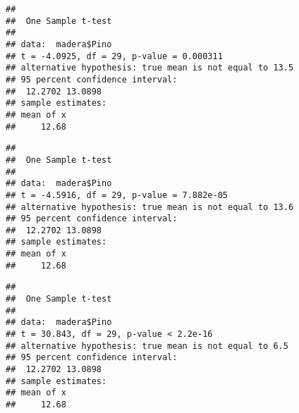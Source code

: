 \documentclass[
]{article}
\newenvironment{Shaded}{\begin{snugshade}}{\end{snugshade}}
\newcommand{\AttributeTok}[1]{\textcolor[rgb]{0.77,0.63,0.00}{#1}}
\newcommand{\CommentTok}[1]{\textcolor[rgb]{0.56,0.35,0.01}{\textit{#1}}}
\newcommand{\FloatTok}[1]{\textcolor[rgb]{0.00,0.00,0.81}{#1}}
\newcommand{\FunctionTok}[1]{\textcolor[rgb]{0.00,0.00,0.00}{#1}}
\newcommand{\NormalTok}[1]{#1}
\newcommand{\SpecialCharTok}[1]{\textcolor[rgb]{0.00,0.00,0.00}{#1}}
\begin{document}
\begin{Shaded}
\end{Shaded}

\begin{verbatim}
## 
##  One Sample t-test
## 
## data:  madera$Pino
## t = -4.0925, df = 29, p-value = 0.000311
## alternative hypothesis: true mean is not equal to 13.5
## 95 percent confidence interval:
##  12.2702 13.0898
## sample estimates:
## mean of x 
##     12.68
\end{verbatim}

\begin{Shaded}
\end{Shaded}

\begin{verbatim}
## 
##  One Sample t-test
## 
## data:  madera$Pino
## t = -4.5916, df = 29, p-value = 7.882e-05
## alternative hypothesis: true mean is not equal to 13.6
## 95 percent confidence interval:
##  12.2702 13.0898
## sample estimates:
## mean of x 
##     12.68
\end{verbatim}

\begin{Shaded}
\end{Shaded}

\begin{verbatim}
## 
##  One Sample t-test
## 
## data:  madera$Pino
## t = 30.843, df = 29, p-value < 2.2e-16
## alternative hypothesis: true mean is not equal to 6.5
## 95 percent confidence interval:
##  12.2702 13.0898
## sample estimates:
## mean of x 
##     12.68
\end{verbatim}
\end{document}
